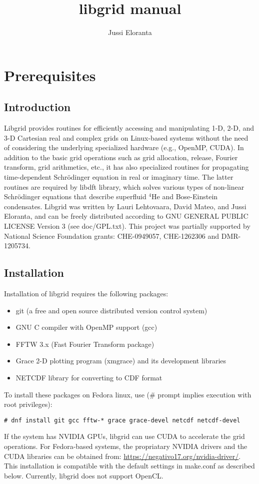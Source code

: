\documentclass[12pt,letterpaper]{report}
\author{Jussi Eloranta}
\title{libgrid manual}
\begin{document}
\maketitle

\chapter{Prerequisites}

\section{Introduction}

Libgrid provides routines for efficiently accessing and manipulating 1-D, 2-D, and 3-D Cartesian real and complex grids on Linux-based systems without the need of considering the underlying specialized hardware (e.g., OpenMP, CUDA). In addition to the basic grid operations such as grid allocation, release, Fourier transform, grid arithmetics, etc., it has also specialized routines for propagating time-dependent Schr\"odinger equation in real or imaginary time. The latter routines are required by libdft library, which solves various types of non-linear Schr\"odinger equations that describe superfluid $^4$He and Bose-Einstein condensates. Libgrid was written by Lauri Lehtovaara, David Mateo, and Jussi Eloranta, and can be freely distributed according to GNU GENERAL PUBLIC LICENSE Version 3 (see doc/GPL.txt). This project was partially supported by National Science Foundation grants: CHE-0949057, CHE-1262306 and DMR-1205734.

\section{Installation}

Installation of libgrid requires the following packages:
\begin{itemize}
\item git (a free and open source distributed version control system)
\item GNU C compiler with OpenMP support (gcc)
\item FFTW 3.x (Fast Fourier Transform package)
\item Grace 2-D plotting program (xmgrace) and its development libraries
\item NETCDF library for converting to CDF format
\end{itemize}
To install these packages on Fedora linux, use (\# prompt implies execution with root privileges): 
\begin{verbatim}
# dnf install git gcc fftw-* grace grace-devel netcdf netcdf-devel
\end{verbatim}
If the system has NVIDIA GPUs, libgrid can use CUDA to accelerate the grid operations. For Fedora-based systems, the propriatary NVIDIA drivers and the CUDA libraries can be obtained from: \url{https://negativo17.org/nvidia-driver/}. This installation is compatible with the default settings in make.conf as described below. Currently, libgrid does not support OpenCL.
\end{document}
